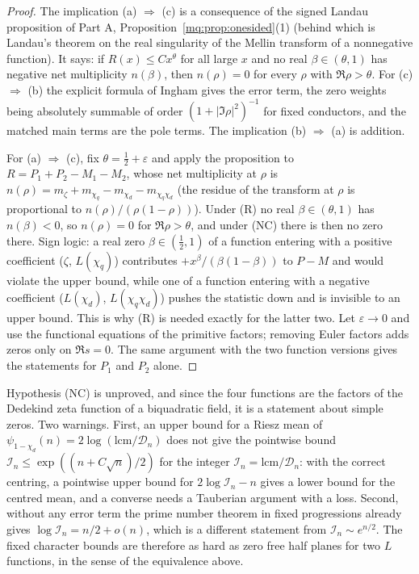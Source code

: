 \begin{proof}
The implication (a) $\Rightarrow$ (c) is a consequence of the signed Landau proposition of Part A, Proposition~\ref{mq:prop:onesided}(1) (behind which is Landau's theorem \cite{Landau05} on the real singularity of the Mellin transform of a nonnegative function). It says: if $R(x)\le Cx^\theta$ for all large $x$ and no real $\beta\in(\theta,1)$ has negative net multiplicity $n(\beta)$, then $n(\rho)=0$ for every $\rho$ with $\Re\rho>\theta$. For (c) $\Rightarrow$ (b) the explicit formula of Ingham \cite{Ingham32} gives the error term, the zero weights being absolutely summable of order $(1+|\Im\rho|^2)^{-1}$ for fixed conductors, and the matched main terms are the pole terms. The implication (b) $\Rightarrow$ (a) is addition.

For (a) $\Rightarrow$ (c), fix $\theta=\frac12+\varepsilon$ and apply the proposition to $R=P_1+P_2-M_1-M_2$, whose net multiplicity at $\rho$ is $n(\rho)=m_\zeta+m_{\chi_q}-m_{\chi_d}-m_{\chi_q\chi_d}$ (the residue of the transform at $\rho$ is proportional to $n(\rho)/(\rho(1-\rho))$). Under (R) no real $\beta\in(\theta,1)$ has $n(\beta)<0$, so $n(\rho)=0$ for $\Re\rho>\theta$, and under (NC) there is then no zero there. Sign logic: a real zero $\beta\in(\frac12,1)$ of a function entering with a positive coefficient ($\zeta$, $L(\chi_q)$) contributes $+x^\beta/(\beta(1-\beta))$ to $P-M$ and would violate the upper bound, while one of a function entering with a negative coefficient ($L(\chi_d)$, $L(\chi_q\chi_d)$) pushes the statistic down and is invisible to an upper bound. This is why (R) is needed exactly for the latter two. Let $\varepsilon\to0$ and use the functional equations of the primitive factors; removing Euler factors adds zeros only on $\Re s=0$. The same argument with the two function versions gives the statements for $P_1$ and $P_2$ alone.
\end{proof}

Hypothesis (NC) is unproved, and since the four functions are the factors of the Dedekind zeta function of a biquadratic field, it is a statement about simple zeros. Two warnings. First, an upper bound for a Riesz mean of $\psi_{1-\chi_d}(n)=2\log(\mathrm{lcm}/\mathcal D_n)$ does not give the pointwise bound $\mathcal I_n\le\exp((n+C\sqrt n)/2)$ for the integer $\mathcal I_n=\mathrm{lcm}/\mathcal D_n$: with the correct centring, a pointwise upper bound for $2\log\mathcal I_n-n$ gives a lower bound for the centred mean, and a converse needs a Tauberian argument with a loss. Second, without any error term the prime number theorem in fixed progressions already gives $\log\mathcal I_n=n/2+o(n)$, which is a different statement from $\mathcal I_n\sim e^{n/2}$. The fixed character bounds are therefore as hard as zero free half planes for two $L$ functions, in the sense of the equivalence above.

